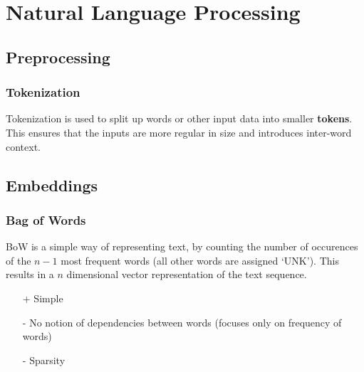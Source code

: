 \section{Natural Language Processing}
\subsection{Preprocessing}
\subsubsection{Tokenization}
Tokenization is used to split up words or other input data into smaller \textbf{tokens}. This ensures that the inputs are more regular in size and introduces inter-word context.

\subsection{Embeddings}

\subsubsection{Bag of Words}
BoW is a simple way of representing text, by counting the number of occurences of the $n-1$ most frequent words (all other words are assigned `UNK').
This results in a $n$ dimensional vector representation of the text sequence.
\begin{itemize}
    \item [+] Simple
    \item [-] No notion of dependencies between words (focuses only on frequency of words)
    \item [-] Sparsity
\end{itemize}
